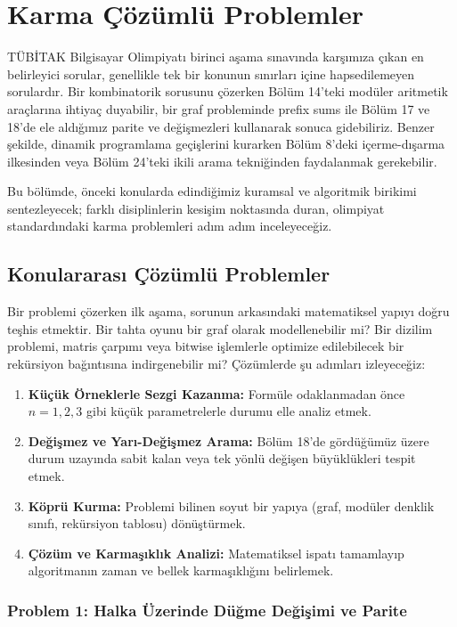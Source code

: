 \chapter{Karma Çözümlü Problemler}

TÜBİTAK Bilgisayar Olimpiyatı birinci aşama sınavında karşımıza çıkan en belirleyici sorular, genellikle tek bir konunun sınırları içine hapsedilemeyen sorulardır. Bir kombinatorik sorusunu çözerken Bölüm 14'teki modüler aritmetik araçlarına ihtiyaç duyabilir, bir graf probleminde prefix sums ile Bölüm 17 ve 18'de ele aldığımız parite ve değişmezleri kullanarak sonuca gidebiliriz. Benzer şekilde, dinamik programlama geçişlerini kurarken Bölüm 8'deki içerme-dışarma ilkesinden veya Bölüm 24'teki ikili arama tekniğinden faydalanmak gerekebilir.

Bu bölümde, önceki konularda edindiğimiz kuramsal ve algoritmik birikimi sentezleyecek; farklı disiplinlerin kesişim noktasında duran, olimpiyat standardındaki karma problemleri adım adım inceleyeceğiz.

\section{Konulararası Çözümlü Problemler}

Bir problemi çözerken ilk aşama, sorunun arkasındaki matematiksel yapıyı doğru teşhis etmektir. Bir tahta oyunu bir graf olarak modellenebilir mi? Bir dizilim problemi, matris çarpımı veya bitwise işlemlerle optimize edilebilecek bir rekürsiyon bağıntısına indirgenebilir mi? Çözümlerde şu adımları izleyeceğiz:
\begin{enumerate}
    \item \textbf{Küçük Örneklerle Sezgi Kazanma:} Formüle odaklanmadan önce $n=1, 2, 3$ gibi küçük parametrelerle durumu elle analiz etmek.
    \item \textbf{Değişmez ve Yarı-Değişmez Arama:} Bölüm 18'de gördüğümüz üzere durum uzayında sabit kalan veya tek yönlü değişen büyüklükleri tespit etmek.
\item \textbf{Köprü Kurma:} Problemi bilinen soyut bir yapıya (graf, modüler denklik sınıfı, rekürsiyon tablosu) dönüştürmek.
    \item \textbf{Çözüm ve Karmaşıklık Analizi:} Matematiksel ispatı tamamlayıp algoritmanın zaman ve bellek karmaşıklığını belirlemek.
\end{enumerate}

\subsection{Problem 1: Halka Üzerinde Düğme Değişimi ve Parite}

